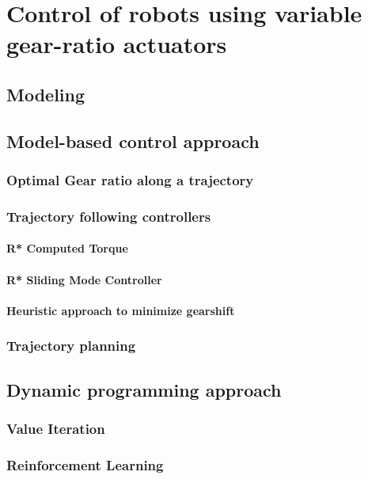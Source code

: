\chapter{Control of robots using variable gear-ratio actuators}
\label{sec:ControlAndPlanningOfRobotUsingVariableGearRatioActuators}


\section{Modeling}
\label{sec:model}


\section{Model-based control approach}
\label{sec:HierachicalControlApproach}


\subsection{Optimal Gear ratio along a trajectory}

\subsection{Trajectory following controllers}

\subsubsection{R* Computed Torque}
\label{sec:RobustTrajectoryFollowingController}

\subsubsection{R* Sliding Mode Controller}

\subsubsection{Heuristic approach to minimize gearshift}


\subsection{Trajectory planning}
\label{sec:SamplingBasedTrajectoryPlanner}


\section{Dynamic programming approach}
\label{sec:DynamicProgrammingAproach}

\subsection{Value Iteration}

\subsection{Reinforcement Learning}

